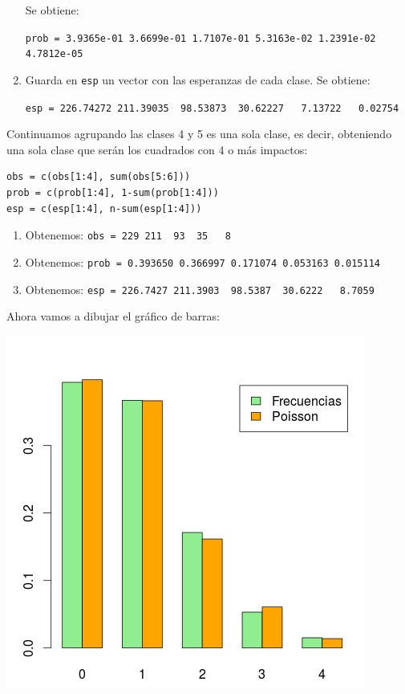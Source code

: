\documentclass[nochap]{apuntes}
\begin{document}
\begin{example}
\begin{enumerate}
Se obtiene:

\verb|prob = 3.9365e-01 3.6699e-01 1.7107e-01 5.3163e-02 1.2391e-02 4.7812e-05|

\item Guarda en \verb|esp| un vector con las esperanzas de cada clase. Se obtiene:

\verb|esp = 226.74272 211.39035  98.53873  30.62227   7.13722   0.02754|
\end{enumerate}

Continuamos agrupando las clases 4 y 5 es una sola clase, es decir, obteniendo una sola clase que serán los cuadrados con 4 o más impactos:

\begin{verbatim}
obs = c(obs[1:4], sum(obs[5:6]))
prob = c(prob[1:4], 1-sum(prob[1:4]))
esp = c(esp[1:4], n-sum(esp[1:4]))
\end{verbatim}

\begin{enumerate}
\item Obtenemos: \verb|obs = 229 211  93  35   8|
\item Obtenemos: \verb|prob = 0.393650 0.366997 0.171074 0.053163 0.015114|
\item Obtenemos: \verb|esp = 226.7427 211.3903  98.5387  30.6222   8.7059|
\end{enumerate}

Ahora vamos a dibujar el gráfico de barras:

\includegraphics[scale=0.5]{img/contrasteba.png}


\end{example}
\end{document}
